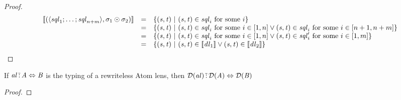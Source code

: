 \documentclass[numbers,10pt,preprint\ifanon ,nocopyrightspace\fi]{sigplanconf}
\begin{document}
\begin{proof}
  \[
    \begin{array}{rcl}
      [ \! [(\langle\mathit{sql}_1;\ldots;\mathit{sql}_{n+m}\rangle,
      \sigma_1\odot\sigma_2)] \! ]
      & = & \{(\mathit{s},\mathit{t})~|~
            (\mathit{s},\mathit{t})\in\mathit{sql}_i\text{ for some $i$}\}\\
      & = & \{(\mathit{s},\mathit{t})~|~
            (\mathit{s},\mathit{t})\in\mathit{sql}_i
            \text{ for some $i\in[1,n]$} \vee
            (\mathit{s},\mathit{t})\in\mathit{sql}_i
            \text{ for some $i\in[n+1,n+m]$}\}\\
      & = & \{(\mathit{s},\mathit{t})~|~
            (\mathit{s},\mathit{t})\in\mathit{sql}_i
            \text{ for some $i\in[1,n]$} \vee
            (\mathit{s},\mathit{t})\in\mathit{sql}_i'
            \text{ for some $i\in[1,m]$}\}\\
      & = & \{(\mathit{s},\mathit{t}) ~|~
            (\mathit{s},\mathit{t})\in[ \! [\mathit{dl}_1] \! ]
            \vee(\mathit{s},\mathit{t})\in[ \! [\mathit{dl}_2] \! ]\}
    \end{array}
  \]

\end{proof}

\begin{lemma}
  \label{lem:typ_sem_todnflens}
  If $\mathit{al} \,\tilde{:}\, \mathit{A} \Leftrightarrow \mathit{B}$ is the
  typing of a rewriteless Atom lens, then
  $\mathcal{D}(\mathit{al}) \,\tilde{:}\, \mathcal{D}(\mathit{A})
  \Leftrightarrow \mathcal{D}(\mathit{B})$
\end{lemma}
\begin{proof}
\end{proof}
\end{document}
